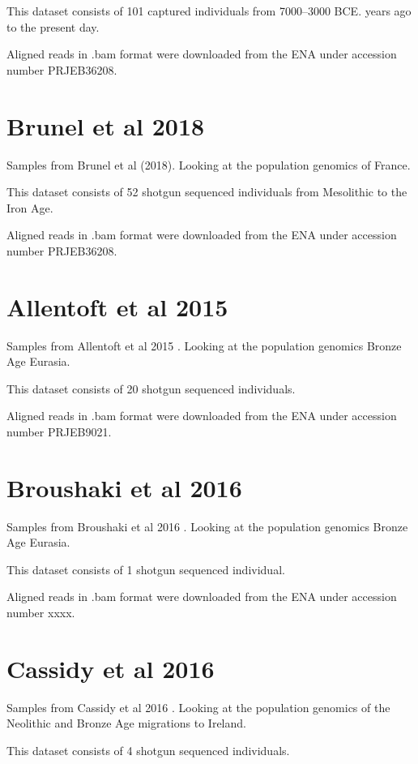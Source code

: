 This dataset consists of 101 captured individuals from 7000–3000 BCE. years ago to the present day. 

Aligned reads in .bam format were downloaded from the ENA under accession number PRJEB36208.


\section{Brunel et al 2018}

Samples from Brunel et al (2018)\cite{Brunel12791}. Looking at the population genomics of France. 

This dataset consists of 52 shotgun sequenced individuals from Mesolithic to the Iron Age. 

Aligned reads in .bam format were downloaded from the ENA under accession number PRJEB36208.

\section{Allentoft et al 2015}

Samples from Allentoft et al 2015 \cite{Allentoft2015}. Looking at the population genomics Bronze Age Eurasia. 

This dataset consists of 20 shotgun sequenced individuals. 

Aligned reads in .bam format were downloaded from the ENA under accession number PRJEB9021.

\section{Broushaki et al 2016}

Samples from Broushaki et al 2016 \cite{Broushaki2016b}. Looking at the population genomics Bronze Age Eurasia. 

This dataset consists of 1 shotgun sequenced individual.

Aligned reads in .bam format were downloaded from the ENA under accession number xxxx.

\section{Cassidy et al 2016}

Samples from Cassidy et al 2016 \cite{Cassidy368}. Looking at the population genomics of the Neolithic and Bronze Age migrations to Ireland. 

This dataset consists of 4 shotgun sequenced individuals.

